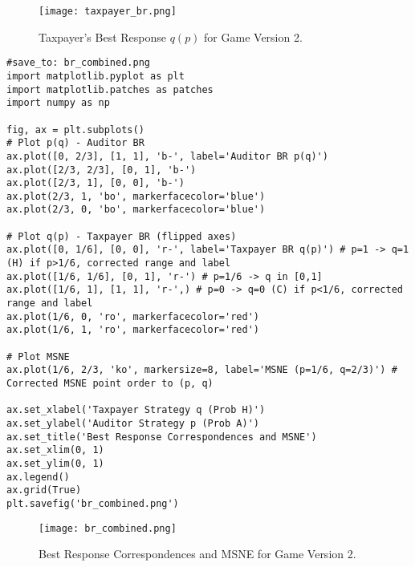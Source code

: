 \documentclass{article}
\begin{document}
\begin{figure}[H]
\centering
\texttt{[image: taxpayer\_br.png]}
\caption{Taxpayer's Best Response $q(p)$ for Game Version 2.}
\label{fig:taxpayer_br}
\end{figure}

\begin{verbatim}
#save_to: br_combined.png
import matplotlib.pyplot as plt
import matplotlib.patches as patches
import numpy as np

fig, ax = plt.subplots()
# Plot p(q) - Auditor BR
ax.plot([0, 2/3], [1, 1], 'b-', label='Auditor BR p(q)')
ax.plot([2/3, 2/3], [0, 1], 'b-')
ax.plot([2/3, 1], [0, 0], 'b-')
ax.plot(2/3, 1, 'bo', markerfacecolor='blue')
ax.plot(2/3, 0, 'bo', markerfacecolor='blue')

# Plot q(p) - Taxpayer BR (flipped axes)
ax.plot([0, 1/6], [0, 0], 'r-', label='Taxpayer BR q(p)') # p=1 -> q=1 (H) if p>1/6, corrected range and label
ax.plot([1/6, 1/6], [0, 1], 'r-') # p=1/6 -> q in [0,1]
ax.plot([1/6, 1], [1, 1], 'r-',) # p=0 -> q=0 (C) if p<1/6, corrected range and label
ax.plot(1/6, 0, 'ro', markerfacecolor='red')
ax.plot(1/6, 1, 'ro', markerfacecolor='red')

# Plot MSNE
ax.plot(1/6, 2/3, 'ko', markersize=8, label='MSNE (p=1/6, q=2/3)') # Corrected MSNE point order to (p, q)

ax.set_xlabel('Taxpayer Strategy q (Prob H)')
ax.set_ylabel('Auditor Strategy p (Prob A)')
ax.set_title('Best Response Correspondences and MSNE')
ax.set_xlim(0, 1)
ax.set_ylim(0, 1)
ax.legend()
ax.grid(True)
plt.savefig('br_combined.png')
\end{verbatim}

\begin{figure}[H]
\centering
\texttt{[image: br\_combined.png]}
\caption{Best Response Correspondences and MSNE for Game Version 2.}
\label{fig:br_combined}
\end{figure}
\end{document}
